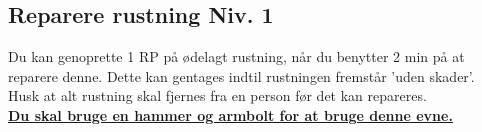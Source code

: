 \subsection*{Reparere rustning Niv. 1}
Du kan genoprette 1 RP på ødelagt rustning, når du benytter 2 min på at reparere denne. Dette kan gentages indtil rustningen fremstår 'uden skader'.\\
Husk at alt rustning skal fjernes fra en person før det kan repareres.\\
\textbf{\underline{Du skal bruge en hammer og armbolt for at bruge denne evne.}}